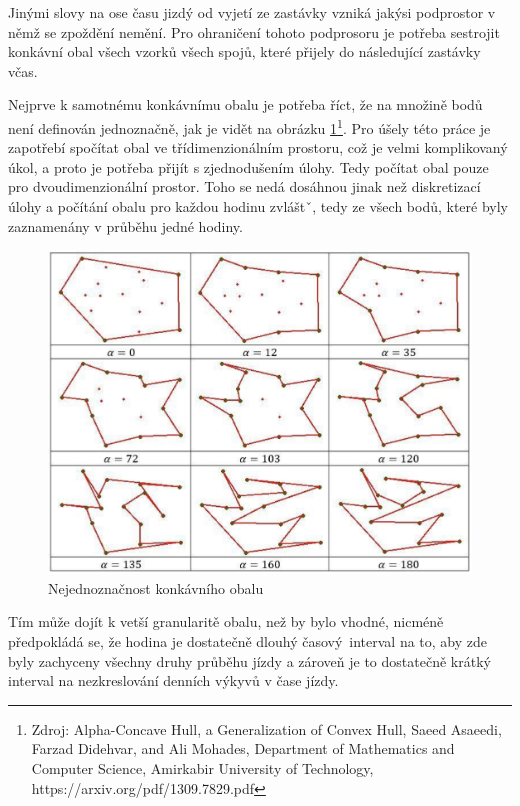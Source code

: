 \bigbreak

Jinými slovy na ose času jizdý od vyjetí ze zastávky vzniká jakýsi podprostor v němž se zpoždění nemění. Pro ohraničení tohoto podprosoru je potřeba sestrojit konkávní obal všech vzorků všech spojů, které přijely do následující zastávky včas.

\bigbreak

Nejprve k samotnému konkávnímu obalu je potřeba říct, že na množině bodů není definován jednoznačně, jak je vidět na obrázku \ref{fig:konkavni_obal_nejednoznacny}\footnote{Zdroj: Alpha-Concave Hull, a Generalization of Convex Hull, Saeed Asaeedi, Farzad Didehvar, and Ali Mohades, Department of Mathematics and Computer Science, Amirkabir University of Technology, https://arxiv.org/pdf/1309.7829.pdf}. Pro úšely této práce je zapotřebí spočítat obal ve třídimenzionálním prostoru, což je velmi komplikovaný úkol, a proto je potřeba přijít s zjednodušením úlohy. Tedy počítat obal pouze pro dvoudimenzionální prostor. Toho se nedá dosáhnou jinak než diskretizací úlohy a počítání obalu pro každou hodinu zvláštˇ, tedy ze všech bodů, které byly zaznamenány v průběhu jedné hodiny.

\begin{figure}
	\centering
  \includegraphics[width=0.8\linewidth]{../img/konkavni_obal_nejednoznacny.png}
  \caption{Nejednoznačnost konkávního obalu}
  \label{fig:konkavni_obal_nejednoznacny}
\end{figure}

 Tím může dojít k vetší granularitě obalu, než by bylo vhodné, nicméně předpokládá se, že hodina je dostatečně dlouhý časový interval na to, aby zde byly zachyceny všechny druhy průběhu jízdy a zároveň je to dostatečně krátký interval na nezkreslování denních výkyvů v čase jízdy.

